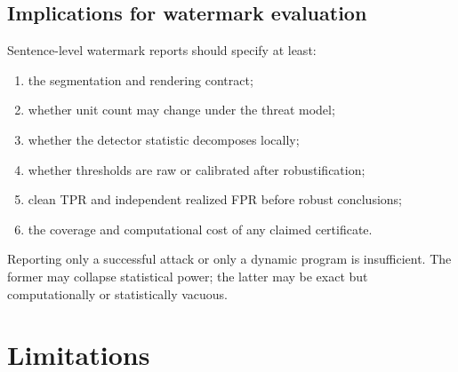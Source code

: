 \documentclass[10pt]{article}
\begin{document}
\subsection{Implications for watermark evaluation}

Sentence-level watermark reports should specify at least:

\begin{enumerate}
  \item the segmentation and rendering contract;
  \item whether unit count may change under the threat model;
  \item whether the detector statistic decomposes locally;
  \item whether thresholds are raw or calibrated after robustification;
  \item clean TPR and independent realized FPR before robust conclusions;
  \item the coverage and computational cost of any claimed certificate.
\end{enumerate}

Reporting only a successful attack or only a dynamic program is insufficient.
The former may collapse statistical power; the latter may be exact but
computationally or statistically vacuous.

\section{Limitations}
\end{document}
